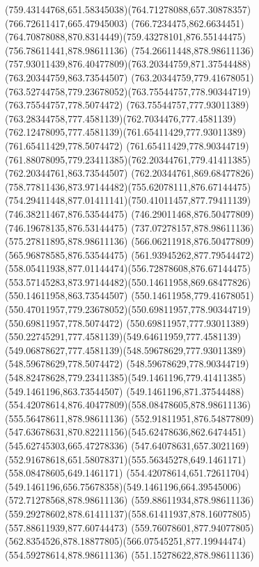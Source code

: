 {{		\curveto(759.43144768,651.58345038)(764.71278088,657.30878357)(766.72611417,665.47945003)
		\lineto(766.7234475,862.6634451)
		\curveto(764.70878088,870.8314449)(759.43278101,876.55144475)(756.78611441,878.98611136)
		\lineto(754.26611448,878.98611136)
		\curveto(757.93011439,876.40477809)(763.20344759,871.37544488)(763.20344759,863.73544507)
		\lineto(763.20344759,779.41678051)
		\curveto(763.52744758,779.23678052)(763.75544757,778.90344719)(763.75544757,778.5074472)
		\curveto(763.75544757,777.93011389)(763.28344758,777.4581139)(762.7034476,777.4581139)
		\curveto(762.12478095,777.4581139)(761.65411429,777.93011389)(761.65411429,778.5074472)
		\curveto(761.65411429,778.90344719)(761.88078095,779.23411385)(762.20344761,779.41411385)
		\lineto(762.20344761,863.73544507)
		\curveto(762.20344761,869.68477826)(758.77811436,873.97144482)(755.62078111,876.67144475)
		\curveto(754.29411448,877.01411141)(750.41011457,877.79411139)(746.38211467,876.53544475)
		\lineto(746.29011468,876.50477809)
		\lineto(746.19678135,876.53144475)
		\lineto(737.07278157,878.98611136)
		\lineto(575.27811895,878.98611136)
		\lineto(566.06211918,876.50477809)
		\lineto(565.96878585,876.53544475)
		\curveto(561.93945262,877.79544472)(558.05411938,877.01144474)(556.72878608,876.67144475)
		\curveto(553.57145283,873.97144482)(550.14611958,869.68477826)(550.14611958,863.73544507)
		\lineto(550.14611958,779.41678051)
		\curveto(550.47011957,779.23678052)(550.69811957,778.90344719)(550.69811957,778.5074472)
		\curveto(550.69811957,777.93011389)(550.22745291,777.4581139)(549.64611959,777.4581139)
		\curveto(549.06878627,777.4581139)(548.59678629,777.93011389)(548.59678629,778.5074472)
		\curveto(548.59678629,778.90344719)(548.82478628,779.23411385)(549.1461196,779.41411385)
		\lineto(549.1461196,863.73544507)
		\curveto(549.1461196,871.37544488)(554.42078614,876.40477809)(558.08478605,878.98611136)
		\lineto(555.56478611,878.98611136)
		\curveto(552.91811951,876.54877809)(547.63678631,870.82211156)(545.62478636,862.6474451)
		\lineto(545.62745303,665.47278336)
		\curveto(547.64078631,657.3021169)(552.91678618,651.58078371)(555.56345278,649.1461171)
		\lineto(558.08478605,649.1461171)
		\curveto(554.42078614,651.72611704)(549.1461196,656.75678358)(549.1461196,664.39545006)
		\moveto(572.71278568,878.98611136)
		\lineto(559.88611934,878.98611136)
		\curveto(559.29278602,878.61411137)(558.61411937,878.16077805)(557.88611939,877.60744473)
		\curveto(559.76078601,877.94077805)(562.8354526,878.18877805)(566.07545251,877.19944474)
		\closepath
		\moveto(554.59278614,878.98611136)
		\lineto(551.15278622,878.98611136)
}}
